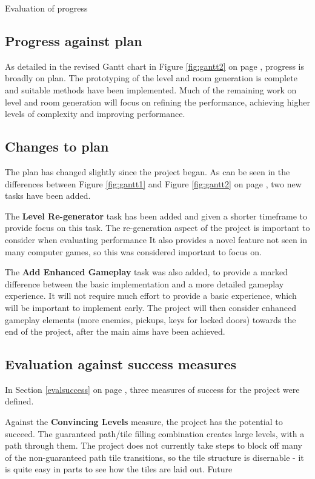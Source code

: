 \documentclass[progress]{cmpreport}
\begin{document}
\begin{section}{Evaluation of progress}

\subsection{Progress against plan}
As detailed in the revised Gantt chart in Figure \ref{fig:gantt2} on page \pageref{fig:gantt2}, progress is broadly on plan. The prototyping of the level and room generation is complete and suitable methods have been implemented. Much of the remaining work on level and room generation will focus on refining the performance, achieving higher levels of complexity and improving performance.

\subsection{Changes to plan}
The plan has changed slightly since the project began. As can be seen in the differences between Figure \ref{fig:gantt1} and Figure \ref{fig:gantt2} on page \pageref{fig:gantt2}, two new tasks have been added.

The \textbf{Level Re-generator} task has been added and given a shorter timeframe to provide focus on this task. The re-generation aspect of the project is important to consider when evaluating performance It also provides a novel feature not seen in many computer games, so this was considered important to focus on.

The \textbf{Add Enhanced Gameplay} task was also added, to provide a marked difference between the basic implementation and a more detailed gameplay experience. It will not require much effort to provide a basic experience, which will be important to implement early. The project will then consider enhanced gameplay elements (more enemies, pickups, keys for locked doors) towards the end of the project, after the main aims have been achieved.

\subsection{Evaluation against success measures}
In Section \ref{evalsuccess} on page \pageref{evalsuccess}, three measures of success for the project were defined. 

Against the \textbf{Convincing Levels} measure, the project has the potential to succeed. The guaranteed path/tile filling combination creates large levels, with a path through them. The project does not currently take steps to block off many of the non-guaranteed path tile transitions, so the tile structure is disernable - it is quite easy in parts to see how the tiles are laid out. Future 

\end{section}
\end{document}
